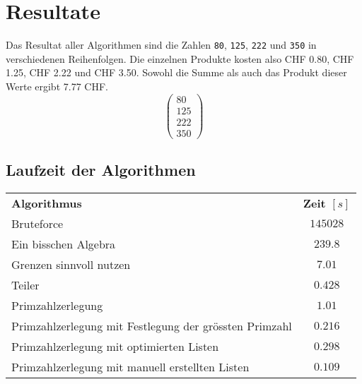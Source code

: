 \documentclass[10pt, fleqn]{article}
\begin{document}
\section{Resultate}
Das Resultat aller Algorithmen sind die Zahlen \verb!80!, \verb!125!, 
\verb!222! und \verb!350! in verschiedenen Reihenfolgen. 
Die einzelnen Produkte kosten also CHF 0.80, CHF 1.25, CHF 2.22 und CHF 3.50. 
Sowohl die Summe als auch das Produkt dieser Werte ergibt 7.77 CHF. 
\[ \begin{pmatrix}80\\125\\222\\350\end{pmatrix} \]

\subsection{Laufzeit der Algorithmen}
\begin{tabular}{@{}lc}
\rowcolor{white}\textbf{Algorithmus}                                    
  &\textbf{Zeit $[s]$} \\
\rowcolor{lgray}Bruteforce                                              
  & $145028$ \\
\rowcolor{white}Ein bisschen Algebra                                    
  & $239.8$ \\
\rowcolor{lgray}Grenzen sinnvoll nutzen                                 
  & $7.01$ \\
\rowcolor{white}Teiler                                                  
  & $0.428$ \\
\rowcolor{lgray}Primzahlzerlegung                                       
  & $1.01$ \\
\rowcolor{white}Primzahlzerlegung mit Festlegung der grössten Primzahl  
  & $0.216$ \\
\rowcolor{lgray}Primzahlzerlegung mit optimierten Listen                
  & $0.298$ \\
\rowcolor{white}Primzahlzerlegung mit manuell erstellten Listen         
  & $0.109$ \\

\end{tabular}

\clearpage
\end{document}
